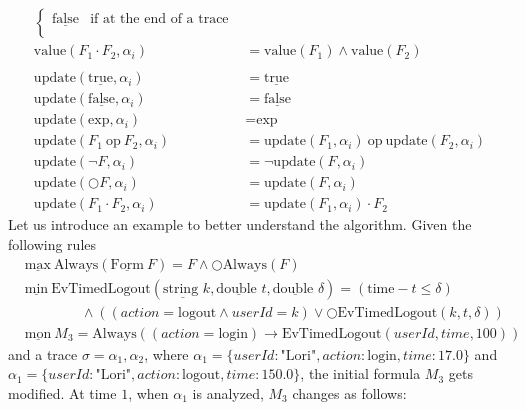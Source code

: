 \documentclass[english]{article}
\begin{document}
{\begin{align*}
\begin{cases}
            \underline{\text{false}} & \text{if at the end of a trace} \\
        \end{cases}\\
        \text{value}(F_1 \cdot F_2,\alpha_i) & = \text{value}(F_1)\land \text{value}(F_2) \\ \\
        \text{update}(\underline{\text{true}},\alpha_i) & = \underline{\text{true}} \\
        \text{update}(\underline{\text{false}},\alpha_i) & = \underline{\text{false}} \\ 
        \text{update}(\text{exp},\alpha_i) & = \text{exp}\\
        \text{update}(F_1\ \text{op}\ F_2,\alpha_i) & = \text{update}(F_1,\alpha_i)\ \text{op}\ \text{update}(F_2,\alpha_i) \\
        \text{update}(\neg{F},\alpha_i) & = \neg{\text{update}(F,\alpha_i)}  \\
        \text{update}(\bigcirc F,\alpha_i) & = \text{update}(F,\alpha_i)  \\
        \text{update}(F_1 \cdot F_2,\alpha_i) & = \text{update}(F_1,\alpha_i)\cdot F_2
    \end{align*}
    }
Let us introduce an example to better understand the algorithm. Given the following rules 
\begin{align*}
    &\underline{\text{max}}\ \text{Always}(\underline{\text{Form}}\ F)  = F \land \bigcirc \text{Always}(F) \\
    &\underline{\text{min}}\ \text{EvTimedLogout}(\underline{\text{string }} k, \underline{\text{double }} t, \underline{\text{double }} \delta) = (\text{time} - t \leq \delta) \\
    &\quad\quad\quad\quad \land ((action = \text{logout} \land userId = k) \lor \bigcirc \text{EvTimedLogout}(k, t, \delta)) \\
    &\underline{\text{mon}}\ M_3  = \text{Always}((action = \text{login}) \rightarrow \text{EvTimedLogout}(userId,time, 100))
\end{align*}
and a trace $\sigma=\alpha_1,\alpha_2$, where $\alpha_1=\{userId:\text{"Lori"},action:\text{login},time:\text{17.0}\}$ and $\alpha_1=\{userId:\text{"Lori"},action:\text{logout},time:\text{150.0}\}$, the initial formula $M_3$ gets modified. At time $1$, when $\alpha_1$ is analyzed, $M_3$ changes as follows:
\end{document}
